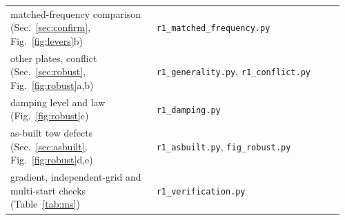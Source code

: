 \begin{table}[!tbp]
\begin{tabular}{@{}>{\raggedright\arraybackslash}p{0.42\linewidth}>{\raggedright\arraybackslash}p{0.54\linewidth}@{}}
matched-frequency comparison (Sec.~\ref{sec:confirm}, Fig.~\ref{fig:levers}b) & \texttt{r1\_matched\_frequency.py}\\
other plates, conflict (Sec.~\ref{sec:robust}, Fig.~\ref{fig:robust}a,b) & \texttt{r1\_generality.py}, \texttt{r1\_conflict.py}\\
damping level and law (Fig.~\ref{fig:robust}c) & \texttt{r1\_damping.py}\\
as-built tow defects (Sec.~\ref{sec:asbuilt}, Fig.~\ref{fig:robust}d,e) & \texttt{r1\_asbuilt.py}, \texttt{fig\_robust.py}\\
gradient, independent-grid and multi-start checks (Table~\ref{tab:ms}) & \texttt{r1\_verification.py}\\
\bottomrule
\end{tabular}
\end{table}
